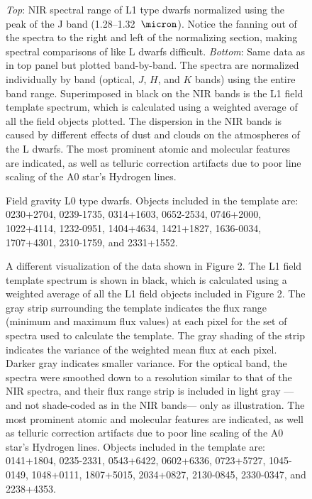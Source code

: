 \documentclass[12pt,preprint]{aastex}
\begin{document}
\begin{figure}
	\caption{\emph{Top}: NIR spectral range of L1 type dwarfs normalized using the peak of the J band (1.28--1.32~$\micron$). Notice the fanning out of the spectra to the right and left of the normalizing section, making spectral comparisons of like L dwarfs difficult. \emph{Bottom}: Same data as in top panel but plotted band-by-band. The spectra are normalized individually by band (optical, $J$, $H$, and $K$ bands) using the entire band range. Superimposed in black on the NIR bands is the L1 field template spectrum, which is calculated using a weighted average of all the field objects plotted. The dispersion in the NIR bands is caused by different effects of dust and clouds on the atmospheres of the L dwarfs. The most prominent atomic and molecular features are indicated, as well as telluric correction artifacts due to poor line scaling of the A0 star's Hydrogen lines.}
	\label{fig:L1fan}
\end{figure}




	\begin{figure}
		\caption{Field gravity L0 type dwarfs. Objects included in the template are: 0230+2704, 0239-1735, 0314+1603, 0652-2534, 0746+2000, 1022+4114, 1232-0951, 1404+4634, 1421+1827, 1636-0034, 1707+4301, 2310-1759, and 2331+1552.}
		\label{fig:L0field}
	\end{figure}

\begin{figure}
	\caption{A different visualization of the data shown in Figure 2. The L1 field template spectrum is shown in black, which is calculated using a weighted average of all the L1 field objects included in Figure 2. The gray strip surrounding the template indicates the flux range (minimum and maximum flux values) at each pixel for the set of spectra used to calculate the template. The gray shading of the strip indicates the variance of the weighted mean flux at each pixel. Darker gray indicates smaller variance. For the optical band, the spectra were smoothed down to a resolution similar to that of the NIR spectra, and their flux range strip is included in light gray ---and not shade-coded as in the NIR bands--- only as illustration. The most prominent atomic and molecular features are indicated, as well as telluric correction artifacts due to poor line scaling of the A0 star's Hydrogen lines. Objects included in the template are: 0141+1804, 0235-2331, 0543+6422, 0602+6336, 0723+5727, 1045-0149, 1048+0111, 1807+5015, 2034+0827, 2130-0845, 2330-0347, and 2238+4353.}
	\label{fig:L1field}
\end{figure}
\end{document}
